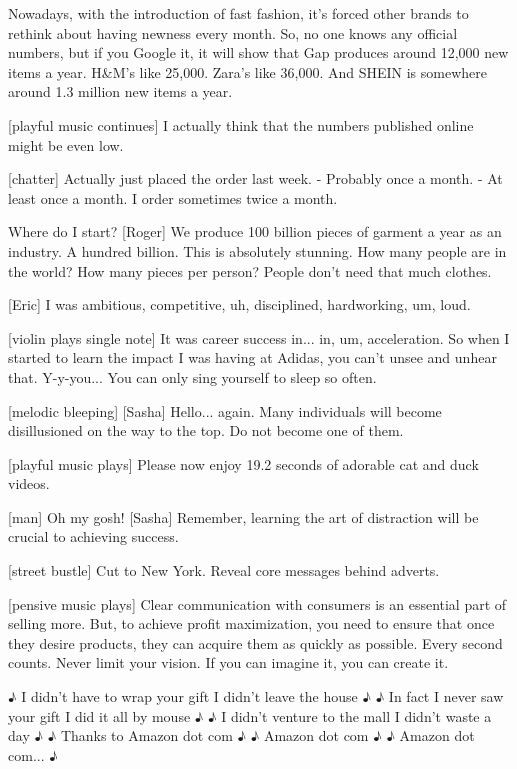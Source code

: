 \documentclass[a4paper]{article}
\begin{document}
	Nowadays, with the introduction of fast fashion, it's forced other brands to rethink about having newness every month.
	So, no one knows any official numbers, but if you Google it, it will show that Gap produces around 12,000 new items a year.
	H\&M's like 25,000.
	Zara's like 36,000.
	And SHEIN is somewhere around 1.3 million new items a year.
	
	
	[playful music continues]
	I actually think that the numbers published online might be even low.

	[chatter]
	Actually just placed the order last week.
	- Probably once a month. 
	- At least once a month.
	I order sometimes twice a month.
	
	
	Where do I start?
	[Roger] We produce 100 billion pieces of garment a year as an industry.
	A hundred billion.
	This is absolutely stunning.
	How many people are in the world?
	How many pieces per person? People don't need that much clothes.

	[Eric] I was ambitious,	competitive, uh, disciplined, hardworking, um, loud.

	[violin plays single note]
	It was career success in... in, um, acceleration. So when I started to learn the impact I was having at Adidas, you can't unsee and unhear that.
	Y-y-you... You can only sing yourself to sleep so often.
	
	[melodic bleeping]
	[Sasha] Hello... again.
	Many individuals will become disillusioned on the way to the top. Do not become one of them.

	[playful music plays]
	Please now enjoy 19.2 seconds of adorable cat and duck videos.
	
	[man] Oh my gosh!
	[Sasha] Remember, learning the art of distraction will be crucial to achieving success.
	
	
	[street bustle]
	Cut to New York. Reveal core messages behind adverts.
	
	[pensive music plays]
	Clear communication with consumers is an essential part of selling more. But, to achieve profit maximization, you need to ensure that once they desire products, they can acquire them as quickly as possible.
	Every second counts.
	Never limit your vision.
	If you can imagine it, you can create it.
	
	
	♪ I didn't have to wrap your gift I didn't leave the house ♪
	♪ In fact I never saw your gift I did it all by mouse ♪
	♪ I didn't venture to the mall I didn't waste a day ♪
	♪ Thanks to Amazon dot com ♪
	♪ Amazon dot com ♪
	♪ Amazon dot com... ♪
	
\end{document}
